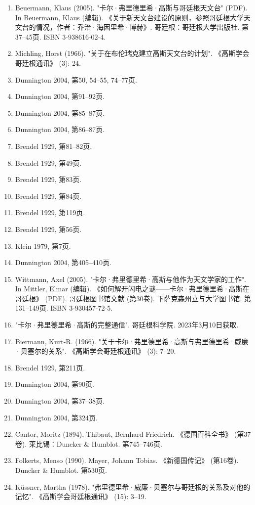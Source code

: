 \begin{enumerate}
\item Beuermann, Klaus (2005). "卡尔·弗里德里希·高斯与哥廷根天文台" (PDF). In Beuermann, Klaus (编辑). 《关于新天文台建设的原则，参照哥廷根大学天文台的情况，作者：乔治·海因里希·博赫》. 哥廷根：哥廷根大学出版社. 第37–45页. ISBN 3-938616-02-4.  
\item Michling, Horst (1966). "关于在布伦瑞克建立高斯天文台的计划". 《高斯学会哥廷根通讯》 (3): 24.  
\item Dunnington 2004, 第50, 54–55, 74–77页.  
\item Dunnington 2004, 第91–92页.  
\item Dunnington 2004, 第85–87页.  
\item Dunnington 2004, 第86–87页.  
\item Brendel 1929, 第81–82页.  
\item Brendel 1929, 第49页.  
\item Brendel 1929, 第83页.  
\item Brendel 1929, 第84页.  
\item Brendel 1929, 第119页.  
\item Brendel 1929, 第56页.  
\item Klein 1979, 第7页.  
\item Dunnington 2004, 第405–410页.  
\item Wittmann, Axel (2005). "卡尔·弗里德里希·高斯与他作为天文学家的工作". In Mittler, Elmar (编辑). 《如何解开闪电之谜——卡尔·弗里德里希·高斯在哥廷根》 (PDF). 哥廷根图书馆文献 (第30卷). 下萨克森州立与大学图书馆. 第131–149页. ISBN 3-930457-72-5.  
\item "卡尔·弗里德里希·高斯的完整通信". 哥廷根科学院. 2023年3月10日获取.  
\item Biermann, Kurt-R. (1966). "关于卡尔·弗里德里希·高斯与弗里德里希·威廉·贝塞尔的关系". 《高斯学会哥廷根通讯》 (3): 7–20.  
\item Brendel 1929, 第211页.  
\item Dunnington 2004, 第90页.  
\item Dunnington 2004, 第37–38页.  
\item Dunnington 2004, 第324页.  
\item Cantor, Moritz (1894). Thibaut, Bernhard Friedrich. 《德国百科全书》 (第37卷). 莱比锡：Duncker & Humblot. 第745–746页.  
\item Folkerts, Menso (1990). Mayer, Johann Tobias. 《新德国传记》 (第16卷). Duncker & Humblot. 第530页.  
\item Küssner, Martha (1978). "弗里德里希·威廉·贝塞尔与哥廷根的关系及对他的记忆". 《高斯学会哥廷根通讯》 (15): 3–19.  

\end{enumerate}
